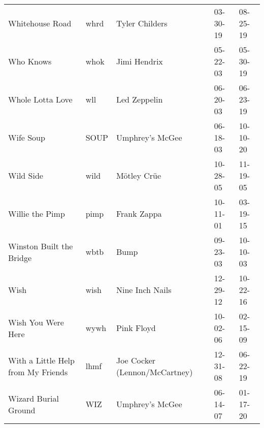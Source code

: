 \begin{longtable}{p{}p{}p{}p{}p{}}
                                                         Whitehouse Road &          whrd &                                           Tyler Childers &              03-30-19 &             08-25-19 \\
                                                               Who Knows &          whok &                                             Jimi Hendrix &              05-22-03 &             05-30-19 \\
                                                        Whole Lotta Love &           wll &                                             Led Zeppelin &              06-20-03 &             06-23-19 \\
                                                               Wife Soup &          SOUP &                                          Umphrey's McGee &              06-18-03 &             10-10-20 \\
                                                               Wild Side &          wild &                                              Mötley Crüe &              10-28-05 &             11-19-05 \\
                                                         Willie the Pimp &          pimp &                                              Frank Zappa &              10-11-01 &             03-19-15 \\
                                                Winston Built the Bridge &          wbtb &                                                     Bump &              09-23-03 &             10-10-03 \\
                                                                    Wish &          wish &                                          Nine Inch Nails &              12-29-12 &             10-22-16 \\
                                                      Wish You Were Here &          wywh &                                               Pink Floyd &              10-02-06 &             02-15-09 \\
                                      With a Little Help from My Friends &          lhmf &                            Joe Cocker (Lennon/McCartney) &              12-31-08 &             06-22-19 \\
                                                    Wizard Burial Ground &           WIZ &                                          Umphrey's McGee &              06-14-07 &             01-17-20 \\

\end{longtable}
